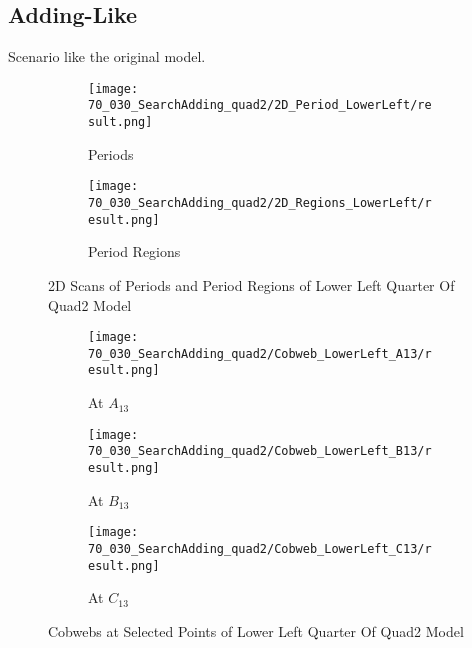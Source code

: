\subsection{Adding-Like}

Scenario like the original model.

\begin{figure}
    \centering
    \begin{subfigure}{0.4\textwidth}
        \centering
        \texttt{[image: 70\_030\_SearchAdding\_quad2/2D\_Period\_LowerLeft/result.png]}
        \caption{Periods}
    \end{subfigure}
    \begin{subfigure}{0.4\textwidth}
        \centering
        \texttt{[image: 70\_030\_SearchAdding\_quad2/2D\_Regions\_LowerLeft/result.png]}
        \caption{Period Regions}
    \end{subfigure}
    \caption{2D Scans of Periods and Period Regions of Lower Left Quarter Of Quad2 Model}
\end{figure}

\begin{figure}
    \centering
    \begin{subfigure}{0.3\textwidth}
        \centering
        \texttt{[image: 70\_030\_SearchAdding\_quad2/Cobweb\_LowerLeft\_A13/result.png]}
        \caption{At $A_{13}$}
    \end{subfigure}
    \begin{subfigure}{0.3\textwidth}
        \centering
        \texttt{[image: 70\_030\_SearchAdding\_quad2/Cobweb\_LowerLeft\_B13/result.png]}
        \caption{At $B_{13}$}
    \end{subfigure}
    \begin{subfigure}{0.3\textwidth}
        \centering
        \texttt{[image: 70\_030\_SearchAdding\_quad2/Cobweb\_LowerLeft\_C13/result.png]}
        \caption{At $C_{13}$}
    \end{subfigure}
    \caption{Cobwebs at Selected Points of Lower Left Quarter Of Quad2 Model}
\end{figure}

